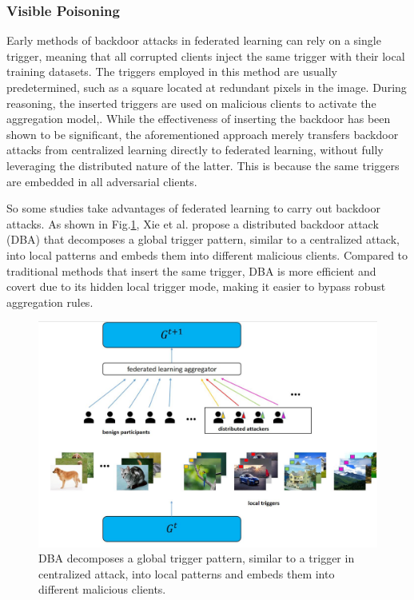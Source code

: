 \documentclass[conference]{IEEEtran}
\begin{document}
\subsubsection{Visible Poisoning}
Early methods of  backdoor attacks in federated learning can rely on a single trigger,
meaning that all corrupted clients inject the same trigger with their local
training datasets. The triggers employed in this method are usually predetermined,
such as a square located at redundant pixels in the image. During reasoning,
the inserted triggers are used on malicious clients to activate the aggregation model\cite{b24},\cite{b27}.
While the effectiveness of inserting the backdoor has been shown to be significant,
the aforementioned approach merely transfers backdoor attacks from centralized
learning directly to federated learning, without fully leveraging
the distributed nature of the latter. This is
because the same triggers are embedded in all adversarial clients.

So some studies take advantages of federated learning to carry out backdoor attacks.
As shown in Fig.\ref{fig8}, Xie et al. \cite{b59} propose a distributed backdoor attack (DBA) that decomposes a global trigger 
pattern, similar to a centralized attack, into local patterns and embeds
them into different malicious clients. Compared to traditional methods that insert
the same trigger, DBA is more efficient and covert due to its hidden local
trigger mode, making it easier to bypass robust aggregation rules.

\begin{figure}[htbp]
    \centerline{\includegraphics[width=0.8\linewidth,height=0.6\linewidth]{picture/f8.jpg}}
    \caption{DBA decomposes a global trigger 
    pattern, similar to a trigger in centralized attack, into local patterns and embeds
    them into different malicious clients.}
    \label{fig8}
\end{figure}
\end{document}
